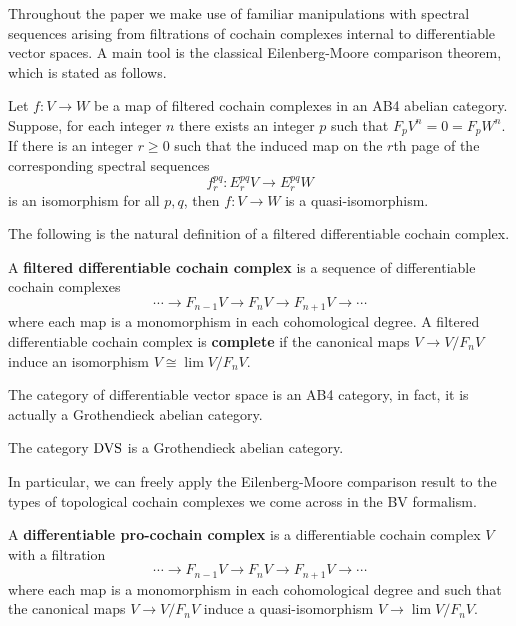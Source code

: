 \documentclass[10pt, oneside]{article}
\begin{document}
Throughout the paper we make use of familiar manipulations with spectral sequences arising from filtrations of cochain complexes internal to differentiable vector spaces. 
A main tool is the classical Eilenberg-Moore comparison theorem, which is stated as follows.

\begin{thm}
Let $f : V \to W$ be a map of filtered cochain complexes in an AB4 abelian category.
Suppose, for each integer $n$ there exists an integer $p$ such that $F_p V^n = 0 = F_p W^n$.
If there is an integer $r \geq 0$ such that the induced map on the $r$th page of the corresponding spectral sequences 
\[
f_r^{pq} :  E_r^{pq} V \to E_r^{pq} W
\]
is an isomorphism for all $p,q$, then $f : V \to W$ is a quasi-isomorphism. 
\end{thm}

The following is the natural definition of a filtered differentiable cochain complex. 

\begin{definition}
A {\bf filtered differentiable cochain complex} is a sequence of differentiable cochain complexes
\[
\cdots \to F_{n-1} V \to F_{n} V \to F_{n+1}V \to \cdots
\]
where each map is a monomorphism in each cohomological degree. 
A filtered differentiable cochain complex is {\bf complete} if the canonical maps $V \to V / F_n V$ induce an isomorphism $V \cong \lim V / F_n V$. 
\end{definition}

The category of differentiable vector space is an AB4 category, in fact, it is actually a Grothendieck abelian category. 

\begin{thm}
The category ${\rm DVS}$ is a Grothendieck abelian category.
\end{thm}

In particular, we can freely apply the Eilenberg-Moore comparison result to the types of topological cochain complexes we come across in the BV formalism. 

\begin{definition}\label{dfn: pro}
A {\bf differentiable pro-cochain complex} is a differentiable cochain complex $V$ with a filtration
\[
\cdots \to F_{n-1} V \to F_{n} V \to F_{n+1}V \to \cdots
\]
where each map is a monomorphism in each cohomological degree and such that the canonical maps $V \to V / F_n V$ induce a quasi-isomorphism $V \to \lim V / F_n V$. 
\end{definition}
\end{document}
